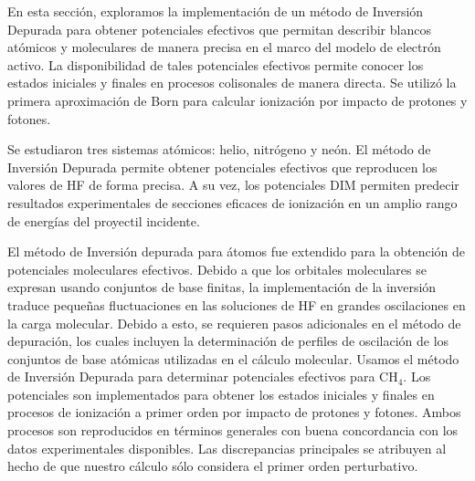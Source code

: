 En esta sección, exploramos la implementación de un método de Inversión
Depurada para obtener potenciales efectivos que permitan describir
blancos atómicos y moleculares de manera precisa en el marco del modelo 
de electrón activo. La disponibilidad de tales potenciales efectivos 
permite conocer los estados iniciales y finales en procesos colisonales 
de manera directa. Se utilizó la primera aproximación de Born para 
calcular ionización por impacto de protones y fotones. 

Se estudiaron tres sistemas atómicos: helio, nitrógeno y neón. El método 
de Inversión Depurada permite obtener potenciales efectivos que 
reproducen los valores de HF de forma precisa. A su vez, los potenciales
DIM permiten predecir resultados experimentales de secciones eficaces
de ionización en un amplio rango de energías del proyectil incidente.

El método de Inversión depurada para átomos fue extendido para la 
obtención de potenciales moleculares efectivos. Debido a que los 
orbitales moleculares se expresan usando conjuntos de base finitas, 
la implementación de la inversión traduce pequeñas fluctuaciones en las
soluciones de HF en grandes oscilaciones en la carga molecular.
Debido a esto, se requieren pasos adicionales en el método de depuración,
los cuales incluyen la determinación de perfiles de oscilación de los
conjuntos de base atómicas utilizadas en el cálculo molecular.
Usamos el método de Inversión Depurada para determinar potenciales
efectivos para CH$_4$. Los potenciales son implementados para obtener
los estados iniciales y finales en procesos de ionización a primer orden
por impacto de protones y fotones. Ambos procesos son reproducidos en 
términos generales con buena concordancia con los datos experimentales 
disponibles. Las discrepancias principales se atribuyen al hecho de 
que nuestro cálculo sólo considera el primer orden perturbativo.




